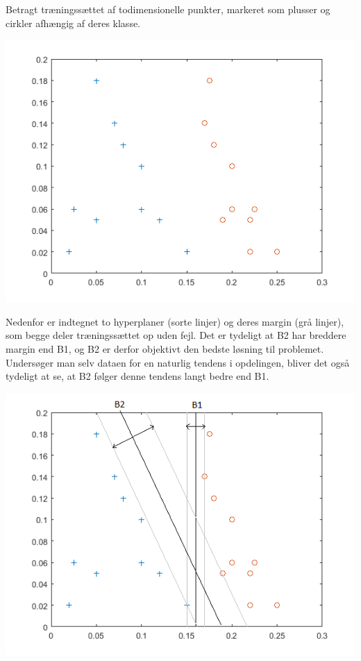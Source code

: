\documentclass{article}
\begin{document}
Betragt træningssættet af todimensionelle punkter, markeret som plusser og cirkler afhængig af deres klasse.

\begin{center}
	\includegraphics{maximal_margin_hyperplane_1}
\end{center}

Nedenfor er indtegnet to hyperplaner (sorte linjer) og deres margin (grå linjer), som begge deler træningssættet op uden fejl. Det er tydeligt at B2 har breddere margin end B1, og B2 er derfor objektivt den bedste løsning til problemet. Undersøger man selv dataen for en naturlig tendens i opdelingen, bliver det også tydeligt at se, at B2 følger denne tendens langt bedre end B1.

\begin{center}
	\includegraphics{maximal_margin_hyperplane_2}
\end{center}
\end{document}
